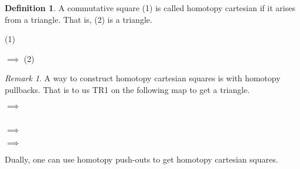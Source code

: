 \documentclass[11pt]{article}
\theoremstyle{definition}
\newtheorem{definition}{Definition}[section]
\theoremstyle{remark}
\newtheorem*{remark}{Remark}
\begin{document}
            \begin{definition}
                A commutative square (1) is called homotopy cartesian if it arises from a triangle. That is, (2) is a triangle.
                \begin{center}
                    (1)
                    $\implies$
                    (2)
                \end{center}
            \end{definition}
                
            \begin{remark}
                A way to construct homotopy cartesian squares is with homotopy pullbacks. That is to us TR1 on the following map to get a triangle.
                \begin{center}
                    $\implies$
                     \\
                    $\implies$
                    $\implies$
                \end{center}

                Dually, one can use homotopy push-outs to get homotopy cartesian squares.
            \end{remark}
\end{document}
